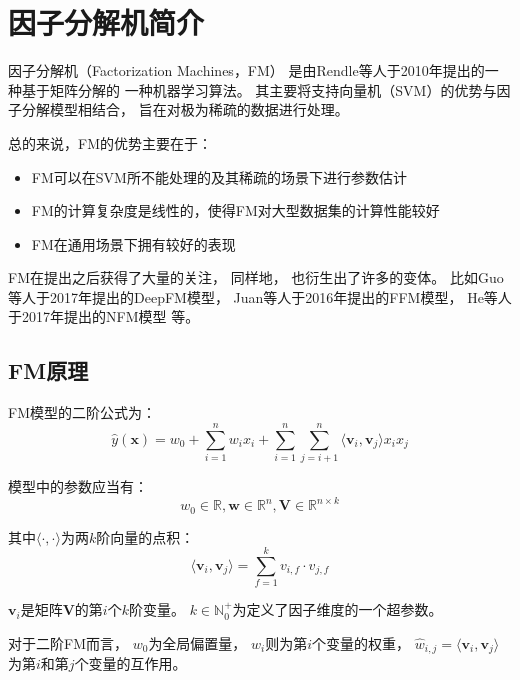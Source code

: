 \section{因子分解机简介}

因子分解机（Factorization Machines，FM）
是由Rendle等人于2010年提出的一种基于矩阵分解的
一种机器学习算法。
其主要将支持向量机（SVM）的优势与因子分解模型相结合，
旨在对极为稀疏的数据进行处理。

总的来说，FM的优势主要在于\cite{rendleFactorizationMachines2010}：
\begin{itemize}
    \item FM可以在SVM所不能处理的及其稀疏的场景下进行参数估计
    \item FM的计算复杂度是线性的，使得FM对大型数据集的计算性能较好
    \item FM在通用场景下拥有较好的表现
\end{itemize}

FM在提出之后获得了大量的关注，
同样地，
也衍生出了许多的变体。
比如Guo等人于2017年提出的DeepFM模型\cite{guoDeepFMFactorizationMachineBased2017}，
Juan等人于2016年提出的FFM模型\cite{juanFieldawareFactorizationMachines2016}，
He等人于2017年提出的NFM模型\cite{heNeuralFactorizationMachines2017}
等。

\subsection{FM原理}

FM模型的二阶公式为：
\begin{equation}
    \hat{y}(\mathbf{x})=w_0+\sum_{i=1}^n w_i x_i+\sum_{i=1}^n\sum_{j=i+1}^n\langle\mathbf{v}_i,\mathbf{v}_j\rangle x_i x_j
\end{equation}

模型中的参数应当有：
\begin{equation}
    w_0\in\mathbb{R}, \mathbf{w}\in\mathbb{R}^n, \mathbf{V}\in\mathbb{R}^{n\times k}
\end{equation}

其中$\langle\cdot,\cdot\rangle$为两$k$阶向量的点积：
\begin{equation}
    \langle\mathbf{v}_i,\mathbf{v}_j\rangle=\sum_{f=1}^k v_{i,f}\cdot v_{j,f}
\end{equation}

$\mathbf{v}_i$是矩阵$\mathbf{V}$的第$i$个$k$阶变量。
$k\in\mathbb{N}_0^+$为定义了因子维度的一个超参数。

对于二阶FM而言，
$w_0$为全局偏置量，
$w_i$则为第$i$个变量的权重，
$\hat{w}_{i,j}=\langle\mathbf{v}_i,\mathbf{v}_j\rangle$
为第$i$和第$j$个变量的互作用。

